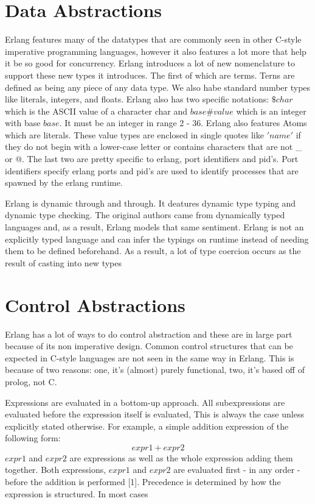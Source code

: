 \documentclass[11pt]{article}
\begin{document}
\section{Data Abstractions}
Erlang features many of the datatypes that are commonly seen in other C-style imperative programming languages, however it also features a lot more that help it be so good for concurrency. Erlang introduces a lot of new nomenclature to support these new types it
introduces. The first of which are terms. Terns are defined as being any piece of any data type. We also habe standard number types like literals, integers, and floats. Erlang also has two specific notations: $\$char$ which is the ASCII value of a character char
and $base\#value$ which is an integer with base $base$. It must be an integer in range 2 - 36. Erlang also features Atoms which are literals. These value types are enclosed in single quotes like $'name'$ if they do not begin with a lower-case letter or contains
characters that are not \_ or @. The last two are pretty specific to erlang, port identifiers and pid's. Port identifiers specify erlang ports and pid's are used to  identify processes that are spawned by the erlang runtime.

Erlang is dynamic through and through. It deatures dynamic type typing and dynamic type checking. The original authors came from dynamically typed languages and, as a result, Erlang models that same sentiment. Erlang is not an explicitly typed language and can
infer the typings on runtime instead of needing them to be defined beforehand. As a result, a lot of type coercion occurs as the result of casting into new types

\section{Control Abstractions}
Erlang has a lot of ways to do control abstraction and these are in large part because of its non imperative design. Common control structures that can be expected in C-style
languages are not seen in the same way in Erlang. This is because of two reasons: one, it's (almost) purely functional, two, it's based off of prolog, not C.


Expressions are evaluated in a bottom-up approach. All subexpressions are evaluated before the expression itself is evaluated, This is always the case unless explicitly stated
otherwise. For example, a simple addition expression of the following form: $$expr1 + expr2$$ $expr1$ and $expr2$ are expressions as well as the whole expression adding them
together. Both expressions, $expr1$ and $expr2$ are evaluated first - in any order - before the addition is performed [1]. Precedence is determined by how the expression is
structured. In most cases
\end{document}
